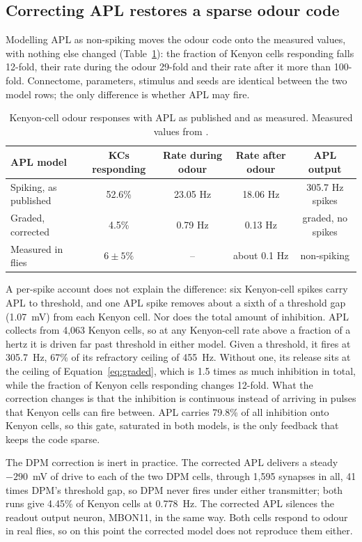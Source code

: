 \documentclass[11pt]{article}
\begin{document}
\subsection{Correcting APL restores a sparse odour code}
Modelling APL as non-spiking moves the odour code onto the measured values, with nothing else changed (Table~\ref{tab:apl}): the fraction of Kenyon cells responding falls 12-fold, their rate during the odour 29-fold and their rate after it more than 100-fold. Connectome, parameters, stimulus and seeds are identical between the two model rows; the only difference is whether APL may fire.

\begin{table}[t]
\centering\small
\caption{Kenyon-cell odour responses with APL as published and as measured. Measured values from \citet{turner2008}.}
\label{tab:apl}
\begin{tabular}{@{}lcccc@{}}
\toprule
APL model & KCs responding & Rate during odour & Rate after odour & APL output \\
\midrule
Spiking, as published & 52.6\% & 23.05 Hz & 18.06 Hz & 305.7 Hz spikes \\
Graded, corrected & 4.5\% & 0.79 Hz & 0.13 Hz & graded, no spikes \\
Measured in flies & $6 \pm 5\%$ & -- & about 0.1 Hz & non-spiking \\
\bottomrule
\end{tabular}
\end{table}

A per-spike account does not explain the difference: six Kenyon-cell spikes carry APL to threshold, and one APL spike removes about a sixth of a threshold gap (1.07~mV) from each Kenyon cell. Nor does the total amount of inhibition. APL collects from 4,063 Kenyon cells, so at any Kenyon-cell rate above a fraction of a hertz it is driven far past threshold in either model. Given a threshold, it fires at 305.7~Hz, 67\% of its refractory ceiling of 455~Hz. Without one, its release sits at the ceiling of Equation~\ref{eq:graded}, which is 1.5 times as much inhibition in total, while the fraction of Kenyon cells responding changes 12-fold. What the correction changes is that the inhibition is continuous instead of arriving in pulses that Kenyon cells can fire between. APL carries 79.8\% of all inhibition onto Kenyon cells, so this gate, saturated in both models, is the only feedback that keeps the code sparse.

The DPM correction is inert in practice. The corrected APL delivers a steady $-290$~mV of drive to each of the two DPM cells, through 1,595 synapses in all, 41 times DPM's threshold gap, so DPM never fires under either transmitter; both runs give 4.45\% of Kenyon cells at 0.778~Hz. The corrected APL silences the readout output neuron, MBON11, in the same way. Both cells respond to odour in real flies, so on this point the corrected model does not reproduce them either.
\end{document}
